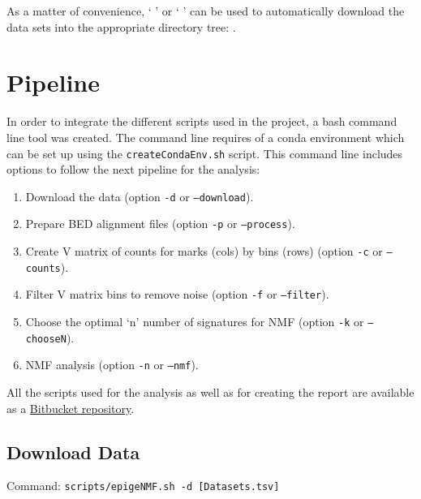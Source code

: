 As a matter of convenience, ` ' or `   ' can be used to automatically download the data sets into the appropriate directory tree: .


\section{Pipeline}

In order to integrate the different scripts used in the project, a bash command line tool was created. The command line requires of a conda environment which can be set up using the \texttt{createCondaEnv.sh} script. This command line includes options to follow the next pipeline for the analysis:

\begin{enumerate}
    \item Download the data (option \texttt{-d} or \texttt{--download}).
    \item Prepare BED alignment files (option \texttt{-p} or \texttt{--process}).
    \item Create V matrix of counts for marks (cols) by bins (rows) (option \texttt{-c} or \texttt{--counts}).
    \item Filter V matrix bins to remove noise (option \texttt{-f} or \texttt{--filter}).
    \item Choose the optimal `n' number of signatures for NMF (option \texttt{-k} or \texttt{--chooseN}).
    \item NMF analysis (option \texttt{-n} or \texttt{--nmf}).
\end{enumerate}

All the scripts used for the analysis as well as for creating the report are available as a \href{https://bitbucket.org/alekssro/mscthesis/src/master/}{Bitbucket repository}.

\subsection{Download Data}

Command: \texttt{scripts/epigeNMF.sh -d [Datasets.tsv]}

\smallskip


